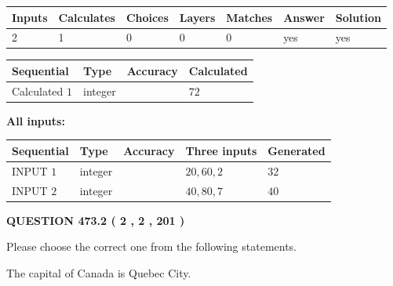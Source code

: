 \documentclass[12pt]{article}
\begin{document}
 

 
   
   
   
   
\noindent\begin{tabular}{|l|l|l|l|l|l|l|}
 \hline
Inputs & Calculates & Choices & Layers & Matches & Answer & Solution \\ \hline
 2  & 
 1  & 
 0
  & 
 0  & 
 0  & 
  yes & 
  yes 
  \\ \hline
 \end{tabular}
   
   
   
   
\noindent{}
   
   
  
  
\noindent\begin{tabular}{|l|l|l|l|}
\hline
 Sequential & Type & Accuracy & Calculated \\ 
\hline
 
 
  Calculated $  1 $ & integer &  & 
  $ 72 $ 
 \\  \hline  
 \end{tabular}
   
   
   
   
\noindent\vspace{0.1in}\hspace{-0.08in} {\textbf{\Large{All inputs: }}}
   
   
  
  
\noindent\begin{tabular}{|l|l|l|l|l|}
\hline
 Sequential & Type & Accuracy & Three inputs & Generated \\ 
\hline
 
 
  INPUT $  1 $ & integer &  & $
 20
 , 
 60
 , 
 2
 $ & $ 32 $ 
 \\  \hline  
 
 
  INPUT $  2 $ & integer &  & $
 40
 , 
 80
 , 
 7
 $ & $ 40 $ 
 \\  \hline  
 \end{tabular}
   
   
  
\vspace{0.2in}
  
{\textbf{\Large{QUESTION
473.2 
 ( 2 , 2 , 201 )
}}}
  
  
Please choose the correct one from the following statements.
 
 
The capital of Canada is Quebec City.
 
\end{document}
